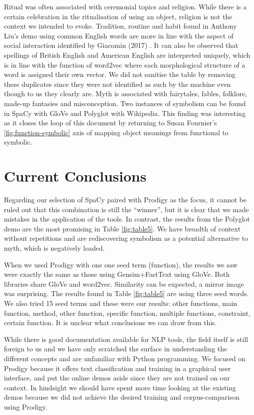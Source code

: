 \documentclass[12pt, usenames, dvipsnames]{report}
\begin{document}
\begin{flushleft}
Ritual was often associated with ceremonial topics and religion.
While there is a certain celebration in the ritualisation of using an object, religion is not the context we intended to evoke.
Tradition, routine and habit found in Anthony Liu’s demo using common English words are more in line with the aspect of social interaction identified by Giacomin (2017) \cite{giacomin2017}.
It can also be observed that spellings of British English and American English are interpreted uniquely, which is in line with the function of word2vec where each morphological structure of a word is assigned their own vector.
We did not sanitise the table by removing these duplicates since they were not identified as such by the machine even though to us they clearly are.
Myth is associated with fairytales, fables, folklore, made-up fantasies and misconception.
Two instances of symbolism can be found in SpaCy with GloVe and Polyglot with Wikipedia.
This finding was interesting as it closes the loop of this document by returning to Susan Fournier’s \ref{fig:function-symbolic} axis of mapping object meanings from functional to symbolic.


\section{Current Conclusions}

Regarding our selection of SpaCy paired with Prodigy as the focus, it cannot be ruled out that this combination is still the “winner”, but it is clear that we made mistakes in the application of the tools.
In contrast, the results from the Polyglot demo are the most promising in Table \ref{fig:table5}. 
We have breadth of context without repetitions and are rediscovering symbolism as a potential alternative to myth, which is negatively loaded.

When we used Prodigy with one one seed term (function), the results we saw were exactly the same as those using Gensim+FastText using GloVe.
Both libraries share GloVe and word2vec. Similarity can be expected, a mirror image was surprising.
The results found in Table \ref{fig:table5} are using three seed words.
We also tried 15 seed terms and these were our results: other functions, main function, method, other function, specific function, multiple functions, constraint, certain function.
It is unclear what conclusions we can draw from this.

While there is good documentation available for NLP tools, the field itself is still foreign to us and we have only scratched the surface in understanding the different concepts and are unfamiliar with Python programming.
We focused on Prodigy because it offers text classification and training in a graphical user interface, and put the online demos aside since they are not trained on our context.
In hindsight we should have spent more time looking at the existing demos because we did not achieve the desired training and corpus-comparison using Prodigy.


\end{flushleft}
\end{document}
